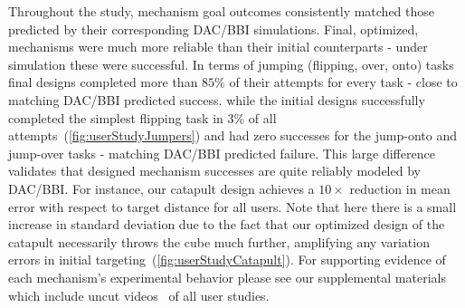 Throughout the study, mechanism goal outcomes consistently matched those predicted by their corresponding DAC/BBI simulations. Final, optimized, mechanisms were much more reliable than their initial counterparts - under simulation these were successful. In terms of jumping (flipping, over, onto) tasks final designs completed more than $85\%$ of their attempts for every task - close to matching DAC/BBI predicted success. while the initial designs successfully completed the simplest flipping task in $3\%$ of all attempts~(\autoref{fig:userStudyJumpers}) and had zero successes for the jump-onto and jump-over tasks - matching DAC/BBI predicted failure. This large difference validates that designed mechanism successes are quite reliably modeled by DAC/BBI.
For instance, our catapult design achieves a $10\times$ reduction in mean error with respect to target distance for all users. Note that here there is a small increase in standard deviation due to the fact that our optimized design of the catapult necessarily throws the cube much further, amplifying any variation errors in initial targeting~(\autoref{fig:userStudyCatapult}).
For supporting evidence of each mechanism's experimental behavior please see our supplemental materials which include uncut videos~\cite{Video} of all user studies.